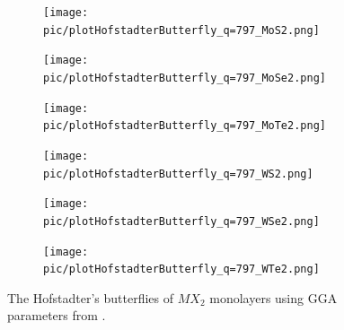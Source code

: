 \documentclass{report}
\begin{document}
\begin{figure}[htb]
	\centering
	\begin{subfigure}[b]{0.32\linewidth}
		\centering
		\texttt{[image: pic/plotHofstadterButterfly\_q=797\_MoS2.png]}
		\label{fig:matt 1}
	\end{subfigure}
	\begin{subfigure}[b]{0.32\linewidth}
		\centering
		\texttt{[image: pic/plotHofstadterButterfly\_q=797\_MoSe2.png]}
		\label{fig:matt 2}
	\end{subfigure}
	\begin{subfigure}[b]{0.32\linewidth}
		\centering
		\texttt{[image: pic/plotHofstadterButterfly\_q=797\_MoTe2.png]}
		\label{fig:matt 3}
	\end{subfigure}
	\begin{subfigure}[b]{0.32\linewidth}
		\centering
		\texttt{[image: pic/plotHofstadterButterfly\_q=797\_WS2.png]}
		\label{fig:matt 4}
	\end{subfigure}
	\begin{subfigure}[b]{0.32\linewidth}
		\centering
		\texttt{[image: pic/plotHofstadterButterfly\_q=797\_WSe2.png]}
		\label{fig:matt 5}
	\end{subfigure}
	\begin{subfigure}[b]{0.32\linewidth}
		\centering
		\texttt{[image: pic/plotHofstadterButterfly\_q=797\_WTe2.png]}
		\label{fig:matt 6}
	\end{subfigure}
	\caption{
		The Hofstadter’s butterflies of $MX_{2}$ monolayers using GGA parameters from \cite{PhysRevB.88.085433}.
	}
\end{figure}
\end{document}
